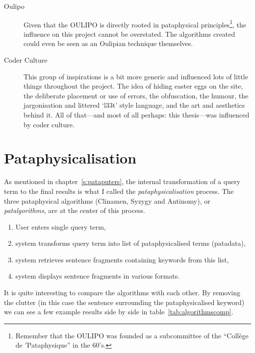 \begin{description}
  \item[Oulipo] Given that the \ac{OULIPO} is directly rooted in pataphysical principles\footnote{Remember that the \ac{OULIPO} was founded as a subcommittee of the ``Coll\`{e}ge de $'$Pataphysique'' in the 60's.}, the influence on this project cannot be overstated. The algorithms created could even be seen as an Oulipian technique themselves.
  \item[Coder Culture] This group of inspirations is a bit more generic and influenced lots of little things throughout the project. The idea of hiding easter eggs on the site, the deliberate placement or use of errors, the obfuscation, the humour, the jargonisation and littered `l33t' style language, and the art and aesthetics behind it. All of that---and most of all perhaps: this thesis---was influenced by coder culture.
\end{description}


\section{Pataphysicalisation}
\label{s:pataphyanalysis}

As mentioned in chapter~\ref{s:pataputers}, the internal transformation of a query term to the final results is what I called the \emph{pataphysicalisation} process. The three pataphysical algorithms (Clinamen, Syzygy and Antinomy), or \emph{patalgorithms}, are at the center of this process. 

\begin{enumerate}
  \item User enters single query term,
  \item system transforms query term into list of pataphysicalised terms (patadata),
  \item system retrieves sentence fragments containing keywords from this list,
  \item system displays sentence fragments in various formats.
\end{enumerate}

It is quite interesting to compare the algorithms with each other. By removing the clutter (in this case the sentence surrounding the pataphysicalised keyword) we can see a few example results side by side in table~\ref{tab:algorithmscomp}.


